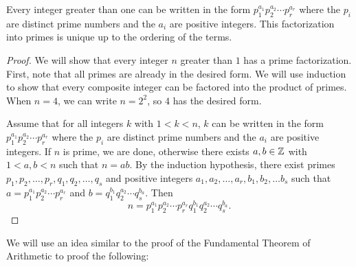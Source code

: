 \documentclass{ximera}
\begin{document}


\begin{thm*}\label{FTA}
	Every integer greater than one can be written in the form $p_1^{a_1}p_2^{a_2}\cdots p_r^{a_r}$ where the $p_i$ are distinct prime numbers and the $a_i$ are positive integers. This factorization into primes is unique up to the ordering of the terms.

	\begin{proof}
 		We will show that every integer $n$ greater than $1$ has a prime factorization. First, note that all primes are already in the desired form. We will use induction to show that every composite integer can be factored into the product of primes. When $n=4$, we can write $n=2^2$, so $4$ has the desired form.
 
		Assume that for all integers $k$ with $1<k<n$, $k$ can be written in the form  $p_1^{a_1}p_2^{a_2}\cdots p_r^{a_r}$ where the $p_i$ are distinct prime numbers and the $a_i$ are positive integers. If $n$ is prime, we are done, otherwise there exists $a,b\in\mathbb Z$ with $1<a,b<n$ such that $n=ab$. By the induction hypothesis, there exist primes $p_1,p_2,\dots,p_r,q_1,q_2,\dots,q_s$ and positive integers $a_1,a_2,\dots,a_r,b_1,b_2,\dots b_s$ such that $a=p_1^{a_1}p_2^{a_2}\cdots p_r^{a_r}$ and $b=q_1^{b_1}q_2^{a_2}\cdots q_s^{b_a}$. Then \[n=p_1^{a_1}p_2^{a_2}\cdots p_r^{a_r}q_1^{b_1}q_2^{a_2}\cdots q_s^{b_a}.\]
	\end{proof}
\end{thm*}

We will use an idea similar to the proof of the Fundamental Theorem of Arithmetic to proof the following:
\end{document}
